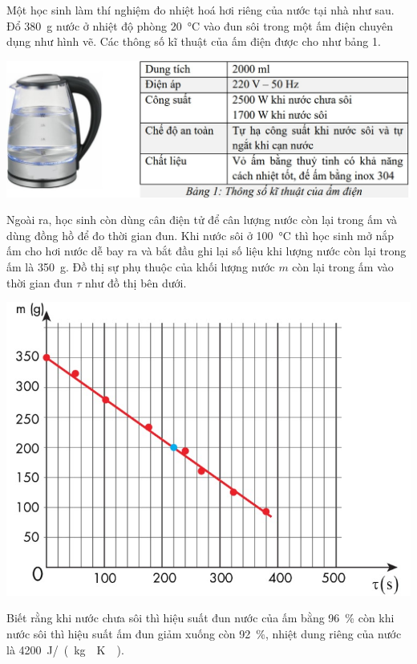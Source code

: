 \begin{ex}
	Một học sinh làm thí nghiệm đo nhiệt hoá hơi riêng của nước tại nhà như sau. Đổ \SI{380}{\gram} nước ở nhiệt độ phòng \SI{20}{\celsius} vào đun sôi trong một ấm điện chuyên dụng như hình vẽ. Các thông số kĩ thuật của ấm điện được cho như bảng 1.
	\begin{center}
		\includegraphics[scale=0.4]{figs/G12Y24B7-1}
	\end{center}
	Ngoài ra, học sinh còn dùng cân điện tử để cân lượng nước còn lại trong ấm và dùng đồng hồ để đo thời gian đun. Khi nước sôi ở \SI{100}{\celsius} thì học sinh mở nắp ấm cho hơi nước dễ bay ra và bắt đầu ghi lại số liệu khi lượng nước còn lại trong ấm là \SI{350}{\gram}. Đồ thị sự phụ thuộc của khối lượng nước $m$ còn lại trong ấm vào thời gian đun $\tau$ như đồ thị bên dưới.
	\begin{center}
		\includegraphics[scale=0.4]{figs/G12Y24B7-2}
	\end{center}
	Biết rằng khi nước chưa sôi thì hiệu suất đun nước của ấm bằng \SI{96}{\percent} còn khi nước sôi thì hiệu suất ấm đun giảm xuống còn \SI{92}{\percent}, nhiệt dung riêng của nước là \SI{4200}{\joule/\left(\kilogram\cdot\kelvin\right)}.
	\choiceTF[t]

\end{ex}
